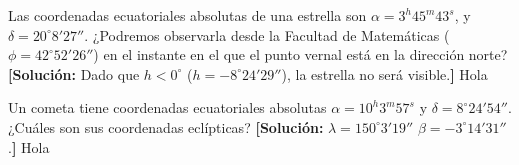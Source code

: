 \begin{texercise}
	Las coordenadas ecuatoriales absolutas de una estrella son 	$\alpha = 3^{h}45^{m}43^{s}$, y $\delta = 20^\circ8'27''$. ¿Podremos observarla desde la Facultad de Matemáticas ($\phi = 42^\circ52'26''$) en el instante en el que el punto 
	vernal está en la dirección norte? \textbf{[Solución:} Dado que $h < 0^\circ$ 
	($h = -8^\circ24'29''$), la estrella no será visible.\textbf{]}
	\tcblower
	Hola
\end{texercise}
\begin{texercise}
	Un cometa tiene coordenadas ecuatoriales absolutas $\alpha = 10^{h}3^{m}57^{s}$ y $\delta = 8^\circ24'54''$. ¿Cuáles son sus coordenadas eclípticas?  
	\textbf{[Solución:} $\lambda = 150^\circ3'19''$	$\beta = -3^\circ14'31''$.\textbf{]}
	\tcblower
	Hola
\end{texercise}

\tcbstoprecording

